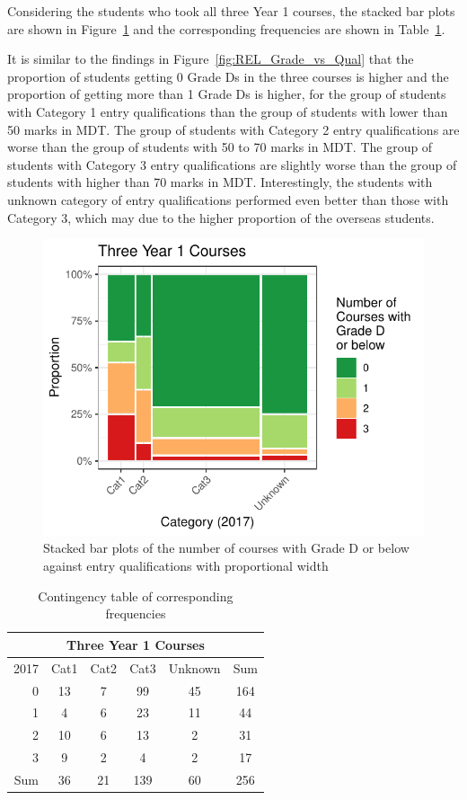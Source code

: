\documentclass[a4paper]{report}
\begin{document}
Considering the students who took all three Year 1 courses, the stacked bar plots are shown in Figure~\ref{fig:REL_Y1Fs_vs_Qual} and the corresponding frequencies are shown in Table~\ref{tab:REL_Y1Fs_vs_Qual}. 

It is similar to the findings in Figure~\ref{fig:REL_Grade_vs_Qual} that the proportion of students getting 0 Grade Ds in the three courses is higher and the proportion of getting more than 1 Grade Ds is higher, for the group of students with Category 1 entry qualifications than the group of students with lower than 50 marks in MDT. The group of students with Category 2 entry qualifications are worse than the group of students with 50 to 70 marks in MDT. The group of students with Category 3 entry qualifications are slightly worse than the group of students with higher than 70 marks in MDT. Interestingly, the students with unknown category of entry qualifications performed even better than those with Category 3, which may due to the higher proportion of the overseas students. 

\begin{figure}[H]
  \centering
  \includegraphics[width=.7\linewidth]{fig/REL_Y1Fs_vs_Qual.pdf}
  \caption{\label{fig:REL_Y1Fs_vs_Qual}Stacked bar plots of the number of courses with Grade D or below against entry qualifications with proportional width}
\end{figure}

\begin{table}[H]
  \centering
  \begin{tabular}{r|cccc|c}
    \hline
    \multicolumn{6}{c}{\textbf{Three Year 1 Courses}} \\
    \hline
   2017 & Cat1 & Cat2 & Cat3 & Unknown & Sum \\ 
    \hline
  0 & 13 & 7 & 99 & 45 & 164 \\ 
    1 & 4 & 6 & 23 & 11 & 44 \\ 
    2 & 10 & 6 & 13 & 2 & 31 \\ 
    3 & 9 & 2 & 4 & 2 & 17 \\ 
    \hline
    Sum & 36 & 21 & 139 & 60 & 256 \\ 
     \hline
  \end{tabular}
  \caption{\label{tab:REL_Y1Fs_vs_Qual}Contingency table of corresponding frequencies}
\end{table}
\end{document}

